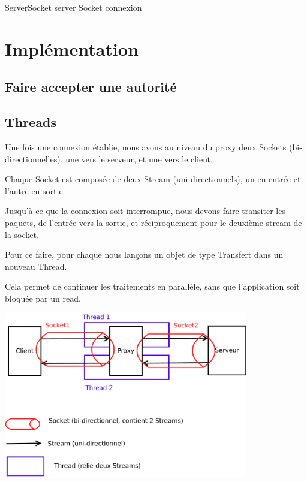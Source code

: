 \documentclass[a4paper,11pt,french]{report}
\begin{document}
\begin{algorithm}[H]
  ServerSocket server\;
  Socket connexion\;
\end{algorithm}



\section{Implémentation}
\subsection{Faire accepter une autorité}


\subsection{Threads}

Une fois une connexion établie, nous avons au niveau du proxy deux Sockets (bi-directionnelles), une vers le serveur, et une vers le client.

Chaque Socket est composée de deux Stream (uni-directionnels), un en entrée et l'autre en sortie.

Jusqu'à ce que la connexion soit interrompue, nous devons faire transiter les paquets, de l'entrée vers la sortie, et réciproquement pour le deuxième stream de la socket.

Pour ce faire, pour chaque nous lançons un objet de type Transfert dans un nouveau Thread.

Cela permet de continuer les traitements en parallèle, sans que l'application soit bloquée par un read.

\includegraphics[width=0.8\textwidth]{images/thread.pdf}
\end{document}
